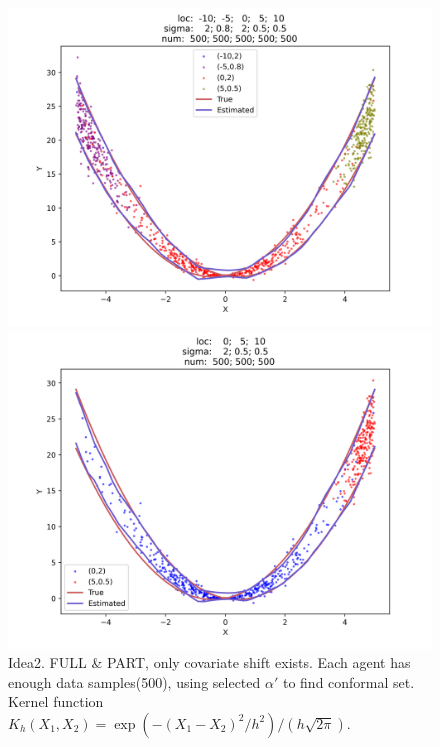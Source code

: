 \documentclass[12pt, a4paper, oneside]{article}
\begin{document}
    \begin{figure}[htbp]
        \centering
        \begin{minipage}{0.495\linewidth}
            \centering
            \includegraphics[width=0.98\linewidth]{fig/Ex2_1/FULL.png}
        \end{minipage}
        \begin{minipage}{0.495\linewidth}
            \centering
            \includegraphics[width=0.98\linewidth]{fig/Ex2_1/PART.png}
        \end{minipage}
        \caption{Idea2. FULL \& PART, only covariate shift exists. Each agent has enough data samples(500), using selected $\alpha'$ to find conformal set. Kernel function $K_h(X_1,X_2)=\exp\left( -{(X_1-X_2)^2}/{h^2} \right)/(h\sqrt{2\pi})$.}
        \label{Fig9}
    \end{figure}
\end{document}
